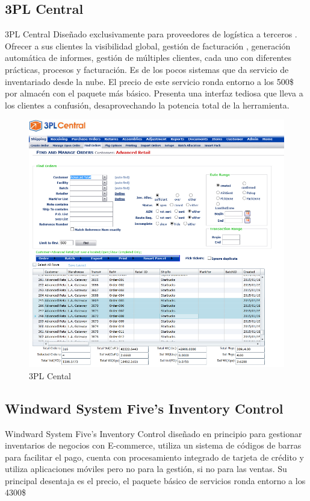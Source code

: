 \documentclass[a4paper,11pt]{book}
\begin{document}
\subsection{3PL Central}

3PL Central\cite{3pl} Diseñado exclusivamente para proveedores de logística a terceros . Ofrecer a sus clientes la visibilidad global, gestión de facturación , generación automática de informes, gestión de múltiples clientes, cada uno con diferentes prácticas, procesos y facturación. Es de los pocos sistemas que da servicio de inventariado desde la nube. El precio de este servicio ronda entorno a los 500\$ por almacén con el paquete más básico. Presenta una interfaz tediosa que lleva a los clientes a confusión, desaprovechando la potencia total de la herramienta.

\begin{figure}[htbpH]  
\centering 
\includegraphics[scale=0.35]{imagenes/estudioArte/pl-800.png}
\caption{ 3PL Cental  }  
\end{figure} 



\subsection{Windward System Five's Inventory Control}


Windward System Five's Inventory Control\cite{wws} diseñado en principio para gestionar inventarios de negocios con E-commerce, utiliza un sistema de códigos de barras para facilitar el pago, cuenta con procesamiento integrado de tarjeta de crédito y utiliza aplicaciones móviles pero no para la gestión, si no para las ventas. Su principal desentaja es el precio, el paquete básico de servicios ronda entorno a los 4300\$
\end{document}
